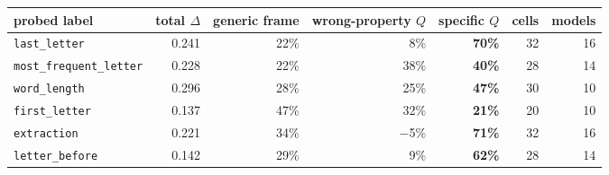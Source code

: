 \begin{tabular}{@{}lrrrrrr@{}}
\toprule
probed label & total $\Delta$ & generic frame & wrong-property $Q$ & specific $Q$ & cells & models \\
\midrule
\texttt{last\_letter} & 0.241 & 22\% & 8\% & \textbf{70\%} & 32 & 16 \\
\texttt{most\_frequent\_letter} & 0.228 & 22\% & 38\% & \textbf{40\%} & 28 & 14 \\
\texttt{word\_length} & 0.296 & 28\% & 25\% & \textbf{47\%} & 30 & 10 \\
\texttt{first\_letter} & 0.137 & 47\% & 32\% & \textbf{21\%} & 20 & 10 \\
\addlinespace[2pt]
\texttt{extraction} & 0.221 & 34\% & $-$5\% & \textbf{71\%} & 32 & 16 \\
\texttt{letter\_before} & 0.142 & 29\% & 9\% & \textbf{62\%} & 28 & 14 \\
\bottomrule
\end{tabular}